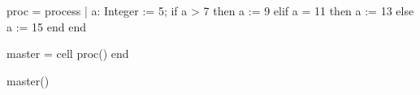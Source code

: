 \begin{code}
proc = process |
  a: Integer := 5;
  if a > 7
    then a := 9
  elif a = 11
    then a := 13
    else a := 15
  end
end

master = cell
  proc()
end

master()
\end{code}
